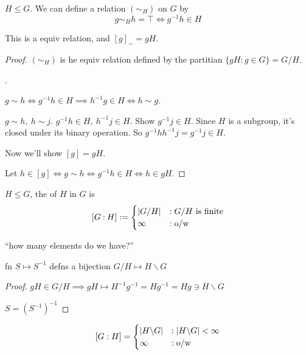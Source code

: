 \documentclass[12pt]{article}
\newcommand{\order}[1]{\left\lvert#1\right\rvert}
\newcommand{\class}[1]{\left[#1\right]}
\newcommand\subgroup{\le}
\begin{document}
\bboxprop
\begin{prop}
    \(H\subgroup G\). We can define a relation \((\sim_H)\) on \(G\) by
    \[
        g\sim_Hh=\top \iff g^{-1}h\in H
    \]

    This is a equiv relation, and \(\class{g}_\sim=gH\).
\end{prop}
\ebox

\bboxproof
\begin{proof}
    \((\sim_H)\) is he equiv relation defined by the
    partitian \(\{gH:g\in G\}=G/H\).

    . 

    \(g\sim h\iff g^{-1}h\in H\implies h^{-1}g\in H\iff h\sim g\).

    \(g\sim h,\ h\sim j\). \(g^{-1}h\in H,\ h^{-1}j\in H\).
    Show \(g^{-1}j\in H\). Since \(H\) is a subgroup, it's
    closed under its binary operation. So
    \(g^{-1}hh^{-1}j=g^{-1}j\in H\).

    Now we'll show \(\class{g}=gH\).

    Let \(h\in\class{g}\iff g\sim h\iff g^{-1}h\in H
    \iff h\in gH\).
\end{proof}
\ebox

\bboxdefn
\begin{defn}[Index]
    \(H\subgroup G\), the  of \(H\) in \(G\) is
    \[
        [G\mathbin{:}H]:=\begin{cases}
            \order{ G / H } &: G / H\ \TR{is\ finite}\\
            \infty          &: \TR{o/w}
        \end{cases}
    \]
\end{defn}
\ebox

``how many elements do we  have?''


\bboxlem
\begin{lem}
    fn \(S\mapsto S^{-1}\) defns a bijection
    \(G/H\mapsto H\backslash G\)
\end{lem}
\ebox

\bboxproof
\begin{proof}
    \(gH\in G/H\implies gH\mapsto H^{-1}g^{-1}
    =Hg^{-1}=Hg\ni H\backslash G\)

    \(S=(S^{-1})^{-1}\)
\end{proof}
\ebox

\bboxcoro
\begin{coro}
    \[
        [G:H]=\begin{cases}
            |H\backslash G|&:|H\backslash G|<\infty\\
            \infty         &:\mathrm{o/w}
        \end{cases}
    \]
\end{coro}
\ebox
\end{document}
